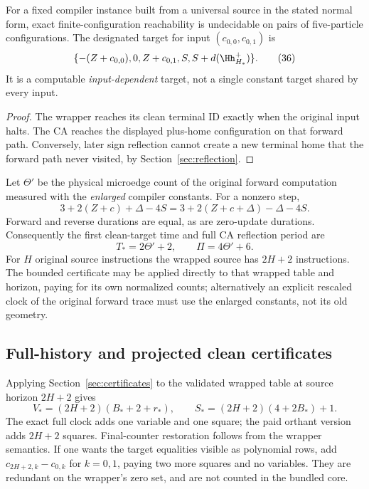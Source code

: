 \begin{corollary}\label{cor:exact}
For a fixed compiler instance built from a universal source in the stated
normal form, exact finite-configuration reachability is undecidable on pairs
of five-particle configurations. The designated target for input
$(c_{0,0},c_{0,1})$ is
\[
 \{-(Z+c_{0,0}),0,Z+c_{0,1},S,S+d(\Hh_{H_*}^+)\}.                 \tag{36}
\]
It is a computable \emph{input-dependent} target, not a single constant target
shared by every input.
\end{corollary}
\begin{proof}
The wrapper reaches its clean terminal ID exactly when the original input
halts. The CA reaches the displayed plus-home configuration on that forward
path. Conversely, later sign reflection cannot create a new terminal home
that the forward path never visited, by Section~\ref{sec:reflection}.
\end{proof}

Let $\Theta'$ be the physical microedge count of the original forward
computation measured with the \emph{enlarged} compiler constants. For a
nonzero step,
\[
 3+2(Z+c)+\Delta-4S
   =3+2(Z+c+\Delta)-\Delta-4S.
\]
Forward and reverse durations are equal, as are zero-update durations.
Consequently the first clean-target time and full CA reflection period are
\[
                  T_*=2\Theta'+2,\qquad \Pi=4\Theta'+6.           \tag{37}
\]
For $H$ original source instructions the wrapped source has $2H+2$
instructions. The bounded certificate may be applied directly to that
wrapped table and horizon, paying for its own normalized counts; alternatively
an explicit rescaled clock of the original forward trace must use the enlarged
constants, not its old geometry.

\subsection{Full-history and projected clean certificates}
Applying Section~\ref{sec:certificates} to the validated wrapped table at
source horizon $2H+2$ gives
\[
 V_*=(2H+2)(B_*+2+r_*),\qquad
 S_*=(2H+2)(4+2B_*)+1.
\]
The exact full clock adds one variable and one square; the paid orthant version
adds $2H+2$ squares. Final-counter restoration follows from the wrapper
semantics. If one wants the target equalities visible as polynomial rows,
add $c_{2H+2,k}-c_{0,k}$ for $k=0,1$, paying two more squares and no variables.
They are redundant on the wrapper's zero set, and are not counted in the
bundled core.

